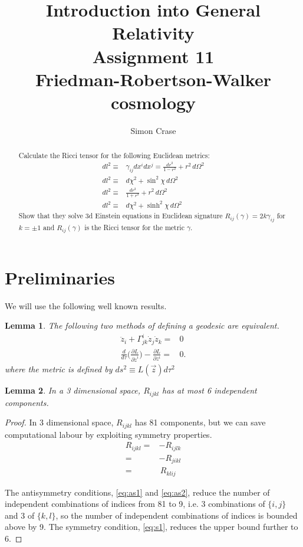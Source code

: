 \documentclass[]{article}
\title{Introduction into General Relativity\\Assignment 11\\Friedman-Robertson-Walker cosmology}
\author{Simon Crase}
\newtheorem{lemma}{Lemma}
\begin{document}
\maketitle

\begin{abstract}
Calculate the Ricci tensor for the following Euclidean metrics:
\begin{align*}
dl^2\equiv&\gamma_{ij}dx^idx^j=\frac{dr^2}{1-r^2}+r^2\,d\Omega^2\\
dl^2\equiv&d\chi^2+\sin^2 \chi\,d\Omega^2\\
dl^2\equiv&\frac{dr^2}{1+r^2}+r^2\,d\Omega^2\\
dl^2\equiv&d\chi^2+\sinh^2 \chi\,d\Omega^2
\end{align*}
Show that they solve 3d Einstein equations in Euclidean signature $R_{ij}(\gamma)=2k\gamma_{ij}$ for $k=\pm 1$ and $R_{ij}(\gamma)$ is the Ricci tensor for the metric $\gamma$.
\end{abstract}

\tableofcontents

\section{Preliminaries}

We will use the following well known results.
\begin{lemma}\label{lemma:geodesic}
	The following two methods of defining a geodesic are equivalent.
	\begin{align*}
	\ddot{z}_i + \Gamma^i_{jk}\dot{z}_j \dot{z}_k =& 0 \\
	\frac{d}{d \tau}\Big(\frac{\partial L}{\partial \dot{z}^i}\Big)-\frac{\partial L}{\partial z^i}=&0.
	\end{align*}
	where the metric is defined by $ds^2\equiv L(\vec{z}) d\tau^2$ 
\end{lemma}

\begin{lemma}\label{lemma:independent-components}
	In a 3 dimensional space, $R_{ijkl}$ has at most 6 independent components.
\end{lemma}
\begin{proof}
	In 3 dimensional space, $R_{ijkl}$ has 81 components, but we can save computational labour by exploiting symmetry properties.
	\begin{align}
	R_{ijkl}=&-R_{ijlk}\label{eq:as1}\\
	=&-R_{jikl}\label{eq:as2}\\
	=&\,R_{klij}\label{eq:s1}
	\end{align}
	
	The antisymmetry conditions, \eqref{eq:as1} and \eqref{eq:as2}, reduce the number of independent combinations of indices from 81 to 9, i.e. 3 combinations of $\{i,j\}$ and 3 of $\{k,l\}$, so the number of independent combinations of indices is bounded above by 9. The symmetry condition, \eqref{eq:s1}, reduces the upper bound further to 6.
\end{proof}
\end{document}
